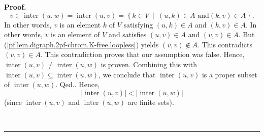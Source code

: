 \documentclass[numbers=enddot,12pt,final,onecolumn,notitlepage]{scrartcl}%
\theoremstyle{definition}
\newenvironment{proof}[1][Proof]{\noindent\textbf{#1.} }{\ \rule{0.5em}{0.5em}}
\newenvironment{verlong}{}{}
\begin{document}
\begin{verlong}
\begin{proof}
{\[
v\in\operatorname*{inter}\left(  u,w\right)  =\operatorname*{inter}\left(
u,v\right)  =\left\{  k\in V\ \mid\ \left(  u,k\right)  \in A\text{ and
}\left(  k,v\right)  \in A\right\}  .
\]
In other words, $v$ is an element $k$ of $V$ satisfying $\left(  u,k\right)
\in A$ and $\left(  k,v\right)  \in A$. In other words, $v$ is an element of
$V$ and satisfies $\left(  u,v\right)  \in A$ and $\left(  v,v\right)  \in A$.
But (\ref{pf.lem.digraph.2pf-chrom.K-free.loopless}) yields $\left(
v,v\right)  \notin A$. This contradicts $\left(  v,v\right)  \in A$. This
contradiction proves that our assumption was false. Hence,
$\operatorname*{inter}\left(  u,v\right)  \neq\operatorname*{inter}\left(
u,w\right)  $ is proven. Combining this with $\operatorname*{inter}\left(
u,v\right)  \subseteq\operatorname*{inter}\left(  u,w\right)  $, we conclude
that $\operatorname*{inter}\left(  u,v\right)  $ is a proper subset of
$\operatorname*{inter}\left(  u,w\right)  $. Qed.}. Hence,
\begin{equation}
\left\vert \operatorname*{inter}\left(  u,v\right)  \right\vert <\left\vert
\operatorname*{inter}\left(  u,w\right)  \right\vert
\label{pf.lem.digraph.2pf-chrom.K-free.c.ieq1}%
\end{equation}
(since $\operatorname*{inter}\left(  u,v\right)  $ and $\operatorname*{inter}%
\left(  u,w\right)  $ are finite sets).


\end{proof}
\end{verlong}
\end{document}
